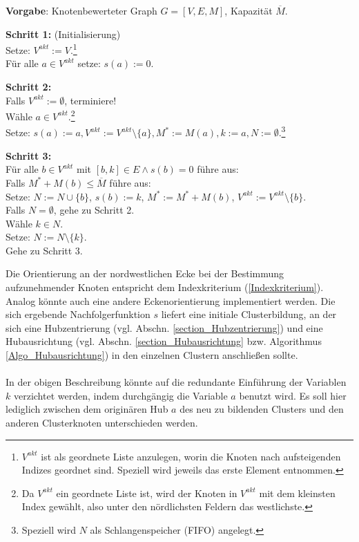 \begin{algo}
\label{Algo NW-Orientierung}
\textbf{Vorgabe}: Knotenbewerteter Graph $G=[V,E,M]$, Kapazität $\overline{M}$.

\noindent 
\textbf{Schritt 1:} (Initialisierung)\\
\phantom \quad Setze: $V^{akt} := V$.\footnote{$V^{akt}$ ist als geordnete Liste anzulegen, worin die Knoten nach aufsteigenden Indizes geordnet sind. Speziell wird jeweils das erste Element entnommen.}\\
\phantom \quad Für alle $a \in V^{akt}$ setze: $s(a) := 0$.

\noindent 
\textbf{Schritt 2:}\\
\phantom \quad Falls $V^{akt} := \emptyset$, terminiere!\\
\phantom \quad Wähle $a \in V^{akt}$.\footnote{Da $V^{akt}$ ein geordnete Liste ist, wird der Knoten in $V^{akt}$ mit dem kleinsten Index gewählt, also unter den nördlichsten Feldern das westlichste.}\\
\phantom \quad Setze: $s(a) := a, V^{akt} := V^{akt} \setminus \{a\}, M^{\ast} := M(a), k := a, N := \emptyset$.\footnote{Speziell wird $N$ als Schlangenspeicher (FIFO) angelegt.}

\noindent 
\textbf{Schritt 3:}\\
\phantom \quad Für alle $b \in V^{akt}$ mit $[b,k] \in E \wedge s(b)=0$ führe aus:\\
\phantom \quad \quad Falls $M^{\ast}+M(b) \leq \overline{M}$ führe aus:\\
\phantom \quad \quad \quad Setze: $N := N \cup \{b\}$, $s(b) := k$, $M^{\ast} := M^{\ast}+M(b)$, $V^{akt} := V^{akt}\setminus \{b\}$.\\
\phantom \quad Falls $N = \emptyset$, gehe zu Schritt 2.\\
\phantom \quad Wähle $k \in N$.\\
\phantom \quad Setze: $N := N \setminus \{k\}$.\\
\phantom \quad Gehe zu Schritt 3.
\end{algo}

\noindent Die Orientierung an der nordwestlichen Ecke bei der Bestimmung aufzunehmender Knoten entspricht dem Indexkriterium (\ref{Indexkriterium}). Analog könnte auch eine andere Eckenorientierung implementiert werden. Die sich ergebende Nachfolgerfunktion $s$ liefert eine initiale Clusterbildung, an der sich eine Hubzentrierung (vgl. Abschn. \ref{section_Hubzentrierung}) und eine Hubausrichtung (vgl. Abschn. \ref{section_Hubausrichtung} bzw. Algorithmus \ref{Algo_Hubausrichtung}) in den einzelnen Clustern anschließen sollte.\\
\\
In der obigen Beschreibung könnte auf die redundante Einführung der Variablen $k$ verzichtet werden, indem durchgängig die Variable $a$ benutzt wird. Es soll hier lediglich zwischen dem originären Hub $a$ des neu zu bildenden Clusters und den anderen Clusterknoten unterschieden werden.


